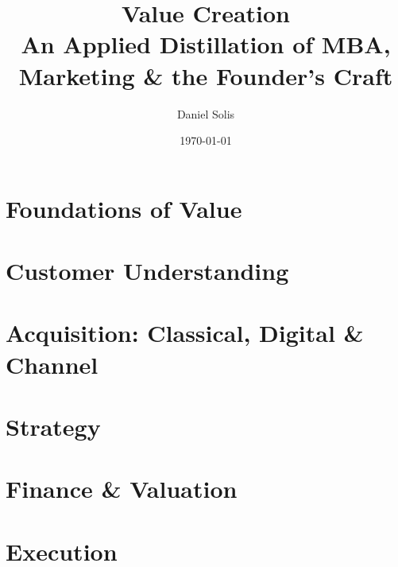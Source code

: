 \documentclass[11pt,a4paper,oneside]{scrbook}
\title{\textbf{Value Creation}\\[0.4em]\large An Applied Distillation of MBA, Marketing \& the Founder's Craft}
\author{Daniel Solis}
\date{\today}
\begin{document}
\frontmatter
\maketitle
\tableofcontents

\mainmatter

\part{Foundations of Value}





\part{Customer Understanding}






\part{Acquisition: Classical, Digital \& Channel}





\part{Strategy}





\part{Finance \& Valuation}







\part{Execution}



\end{document}
